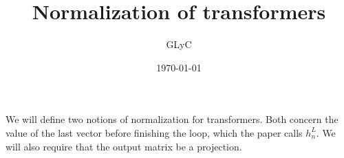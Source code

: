 \documentclass{article}
\title{Normalization of transformers}
\author{GLyC}
\date{\today}
\begin{document}
\maketitle

We will define two notions of normalization for transformers. Both concern the value of the last vector before finishing the loop, which the paper calls $h_n^L$. We will also require that the output matrix be a projection.






\end{document}

